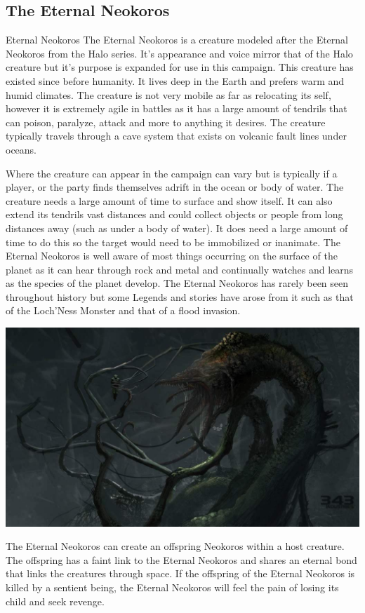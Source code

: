 \subsection{The Eternal Neokoros}

\begin{commentbox}{Eternal Neokoros}	
	The Eternal Neokoros is a creature modeled after the Eternal Neokoros from the Halo series. It's appearance and voice mirror that of the Halo creature but it's purpose is expanded for use in this campaign. This creature has existed since before humanity. It lives deep in the Earth and prefers warm and humid climates. The creature is not very mobile as far as relocating its self, however it is extremely agile in battles as it has a large amount of tendrils that can poison, paralyze, attack and more to anything it desires. The creature typically travels through a cave system that exists on volcanic fault lines under oceans. 
	
	Where the creature can appear in the campaign can vary but is typically if a player, or the party finds themselves adrift in the ocean or body of water. The creature needs a large amount of time to surface and show itself. It can also extend its tendrils vast distances and could collect objects or people from long distances away (such as under a body of water). It does need a large amount of time to do this so the target would need to be immobilized or inanimate. The Eternal Neokoros is well aware of most things occurring on the surface of the planet as it can hear through rock and metal and continually watches and learns as the species of the planet develop. The Eternal Neokoros has rarely been seen throughout history but some Legends and stories have arose from it such as that of the Loch'Ness Monster and that of a flood invasion.
	
	\begin{center}
		\includegraphics[width=0.6\linewidth]{img/Halo/gravemind.jpg}
	\end{center}

	The Eternal Neokoros can create an offspring Neokoros within a host creature. The offspring has a faint link to the Eternal Neokoros and shares an eternal bond that links the creatures through space. If the offspring of the Eternal Neokoros is killed by a sentient being, the Eternal Neokoros will feel the pain of losing its child and seek revenge.
\end{commentbox}

